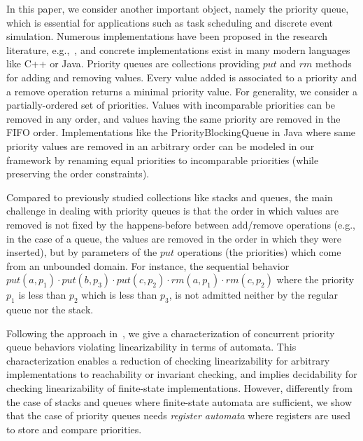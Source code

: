 In this paper, we consider another important object, namely the priority queue, which is essential for applications such as task scheduling and discrete event simulation. Numerous implementations have been proposed in the research literature, e.g.,~\cite{DBLP:conf/ppopp/AlistarhKLS15,DBLP:conf/wdag/CalciuMH14,DBLP:conf/opodis/LindenJ13,DBLP:conf/podc/ShavitZ99,DBLP:conf/ipps/ShavitL00}, and concrete implementations exist in many modern languages like C++ or Java.  
%
%
Priority queues are collections providing $\textit{put}$ and $\textit{rm}$ methods for adding and removing values. Every value added is associated to a priority and a remove operation returns a minimal priority value. For generality, we consider a partially-ordered set of priorities. Values with incomparable priorities can be removed in any order, and values having the same priority are removed in the FIFO order. Implementations like the PriorityBlockingQueue in Java where same priority values are removed in an arbitrary order can be modeled in our framework by renaming equal priorities to incomparable priorities (while preserving the order constraints).

Compared to previously studied collections like stacks and queues, the main challenge in dealing with priority queues is that the order in which values are removed is not fixed by the happens-before between add/remove operations (e.g., in the case of a queue, the values are removed in the order in which they were inserted), but by parameters of the $\textit{put}$ operations (the priorities) which come from an unbounded domain. For instance, the sequential behavior $\textit{put}(a,p_1)\cdot \textit{put}(b,p_3)\cdot \textit{put}(c,p_2)\cdot \textit{rm}(a,p_1)\cdot \textit{rm}(c,p_2)$ where the priority $p_1$ is less than $p_2$ which is less than $p_3$, is not admitted neither by the regular queue nor the stack. 



Following the approach in~\cite{DBLP:conf/icalp/BouajjaniEEH15}, we give a characterization of concurrent priority queue behaviors violating linearizability in terms of automata. This characterization enables a reduction of checking linearizability for arbitrary implementations to reachability or invariant checking, and implies decidability for checking linearizability of finite-state implementations. However, differently from the case of stacks and queues where finite-state automata are sufficient, we show that the case of priority queues needs \emph{register automata} where registers are used to store and compare priorities.

